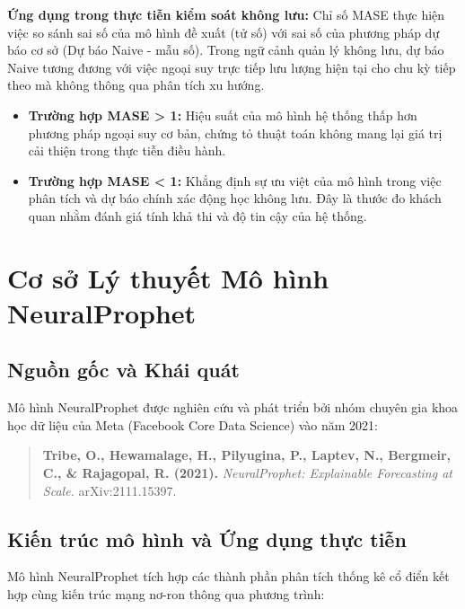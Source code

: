 \documentclass[12pt,a4paper]{article}
\begin{document}
\textbf{Ứng dụng trong thực tiễn kiểm soát không lưu:}
Chỉ số MASE thực hiện việc so sánh sai số của mô hình đề xuất (tử số) với sai số của phương pháp dự báo cơ sở (Dự báo Naive - mẫu số). Trong ngữ cảnh quản lý không lưu, dự báo Naive tương đương với việc ngoại suy trực tiếp lưu lượng hiện tại cho chu kỳ tiếp theo mà không thông qua phân tích xu hướng.
\begin{itemize}
    \item \textbf{Trường hợp MASE > 1:} Hiệu suất của mô hình hệ thống thấp hơn phương pháp ngoại suy cơ bản, chứng tỏ thuật toán không mang lại giá trị cải thiện trong thực tiễn điều hành.
    \item \textbf{Trường hợp MASE < 1:} Khẳng định sự ưu việt của mô hình trong việc phân tích và dự báo chính xác động học không lưu. Đây là thước đo khách quan nhằm đánh giá tính khả thi và độ tin cậy của hệ thống.
\end{itemize}


\section{Cơ sở Lý thuyết Mô hình NeuralProphet}

\subsection{Nguồn gốc và Khái quát}

Mô hình NeuralProphet được nghiên cứu và phát triển bởi nhóm chuyên gia khoa học dữ liệu của Meta (Facebook Core Data Science) vào năm 2021:

\begin{quote}
\textbf{Tribe, O., Hewamalage, H., Pilyugina, P., Laptev, N., Bergmeir, C., \& Rajagopal, R. (2021).} \textit{NeuralProphet: Explainable Forecasting at Scale.} arXiv:2111.15397.
\end{quote}

\subsection{Kiến trúc mô hình và Ứng dụng thực tiễn}

Mô hình NeuralProphet tích hợp các thành phần phân tích thống kê cổ điển kết hợp cùng kiến trúc mạng nơ-ron thông qua phương trình:
\end{document}
